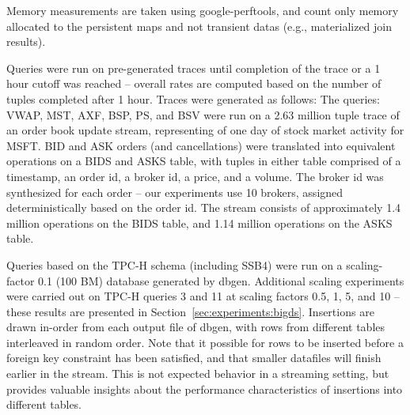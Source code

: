 Memory measurements are taken using google-perftools\cite{perftools}, and count only memory allocated to the persistent maps and not transient datas (e.g., materialized join results).  



Queries were run on pre-generated traces until completion of the trace or a 1 hour cutoff was reached -- overall rates are computed based on the number of tuples completed after 1 hour.  Traces were generated as follows: The queries: VWAP, MST, AXF, BSP, PS, and BSV were run on a 2.63 million tuple trace of an order book update stream, representing of one day of stock market activity for MSFT.  BID and ASK orders (and cancellations) were translated into equivalent operations on a BIDS and ASKS table, with tuples in either table comprised of a timestamp, an order id, a broker id, a price, and a volume.  The broker id was synthesized for each order -- our experiments use 10 brokers, assigned deterministically based on the order id.  The stream consists of approximately 1.4 million operations on the BIDS table, and 1.14 million operations on the ASKS table.

Queries based on the TPC-H schema (including SSB4) were run on a scaling-factor 0.1 (100 BM) database generated by dbgen\cite{tpch}.  Additional scaling experiments were carried out on TPC-H queries 3 and 11 at scaling factors 0.5, 1, 5, and 10 -- these results are presented in Section~\ref{sec:experiments:bigds}.  Insertions are drawn in-order from each output file of dbgen, with rows from different tables interleaved in random order.  Note that it possible for rows to be inserted before a foreign key constraint has been satisfied, and that smaller datafiles will finish earlier in the stream.  This is not expected behavior in a streaming setting, but provides valuable insights about the performance characteristics of insertions into different tables.

